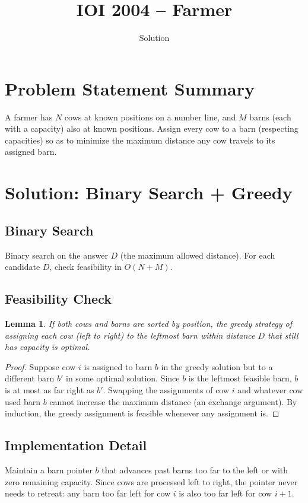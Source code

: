 \documentclass[11pt,a4paper]{article}
\title{IOI 2004 -- Farmer}
\author{Solution}
\date{}
\newtheorem{lemma}[theorem]{Lemma}
\begin{document}
\maketitle

\section{Problem Statement Summary}
A farmer has $N$ cows at known positions on a number line, and $M$ barns
(each with a capacity) also at known positions. Assign every cow to a
barn (respecting capacities) so as to minimize the maximum distance any
cow travels to its assigned barn.

\section{Solution: Binary Search + Greedy}

\subsection{Binary Search}
Binary search on the answer $D$ (the maximum allowed distance). For
each candidate $D$, check feasibility in $O(N + M)$.

\subsection{Feasibility Check}
\begin{lemma}
If both cows and barns are sorted by position, the greedy strategy of
assigning each cow (left to right) to the leftmost barn within distance
$D$ that still has capacity is optimal.
\end{lemma}
\begin{proof}
Suppose cow $i$ is assigned to barn $b$ in the greedy solution but to
a different barn $b'$ in some optimal solution. Since $b$ is the leftmost
feasible barn, $b$ is at most as far right as $b'$. Swapping the
assignments of cow $i$ and whatever cow used barn $b$ cannot increase
the maximum distance (an exchange argument). By induction, the greedy
assignment is feasible whenever any assignment is.
\end{proof}

\subsection{Implementation Detail}
Maintain a barn pointer $b$ that advances past barns too far to the left
or with zero remaining capacity. Since cows are processed left to right,
the pointer never needs to retreat: any barn too far left for cow $i$ is
also too far left for cow $i{+}1$.
\end{document}
